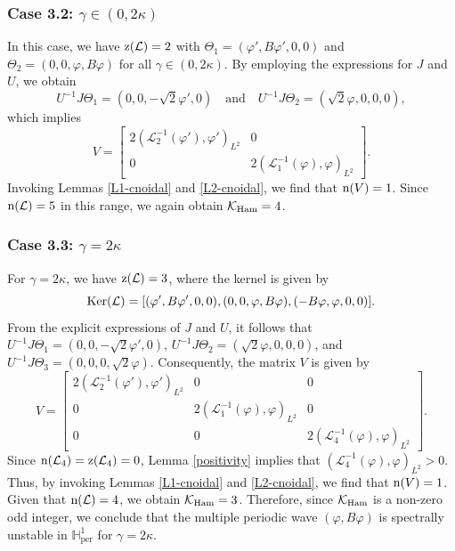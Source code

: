 \documentclass[10pt,reqno,a4paper]{amsart} %
\theoremstyle{definition} %
\numberwithin{equation}{section}
\numberwithin{figure}{section}
\begin{document}
\subsubsection*{Case 3.2: $\gamma \in (0,2\kappa)$} 
In this case, we have ${\rm z}(\mathcal{L}) = 2$ with $\Theta_1 = (\varphi', B \varphi', 0,0)$ and $\Theta_2 = (0,0, \varphi, B \varphi)$ for all $\gamma \in \left( 0, 2\kappa \right)$. By employing the expressions for $J$ and $U$, we obtain
\begin{equation*}
    U^{-1} J \Theta_1 = (0,0, -\sqrt{2} \varphi', 0) \quad \text{and} \quad U^{-1} J \Theta_2 = (\sqrt{2} \varphi, 0, 0, 0),
\end{equation*}
which implies
\begin{equation*}
    V = \begin{bmatrix}
        2 \left(\mathcal{L}_2^{-1} (\varphi'), \varphi'\right)_{L^2} & 0 \\
        0 & 2 \left(\mathcal{L}_1^{-1} (\varphi), \varphi\right)_{L^2}
    \end{bmatrix}.
\end{equation*}
Invoking Lemmas \ref{L1-cnoidal} and \ref{L2-cnoidal}, we find that ${\rm n}(V) = 1$. Since ${\rm n}(\mathcal{L}) = 5$ in this range, we again obtain $\mathcal{K}_{\rm Ham} = 4$.

\subsubsection*{Case 3.3: $\gamma = 2\kappa$} 

For $\gamma = 2 \kappa$, we have ${\rm z}(\mathcal{L}) = 3$, where the kernel is given by
\begin{equation*}
    {\rm Ker}(\mathcal{L}) = [(\varphi',B\varphi',0,0), (0,0,\varphi,B\varphi), (-B\varphi,\varphi,0,0)].
\end{equation*}
From the explicit expressions of $J$ and $U$, it follows that $U^{-1} J \Theta_1 = (0,0, -\sqrt{2} \varphi', 0)$, $U^{-1} J \Theta_2 = (\sqrt{2} \varphi, 0, 0, 0)$, and $U^{-1} J \Theta_3 = (0,0,0,\sqrt{2}\varphi)$. Consequently, the matrix $V$ is given by
\begin{equation*}
    V = \begin{bmatrix}
        2 \left(\mathcal{L}_2^{-1} (\varphi'), \varphi'\right)_{L^2} & 0 & 0 \\
        0 & 2 \left(\mathcal{L}_1^{-1} (\varphi), \varphi\right)_{L^2} & 0 \\
        0 & 0 & 2 \left(\mathcal{L}_4^{-1} (\varphi), \varphi\right)_{L^2}
    \end{bmatrix}.
\end{equation*}
Since ${\rm n}(\mathcal{L}_4) = {\rm z}(\mathcal{L}_4) = 0$, Lemma \ref{positivity} implies that $\left(\mathcal{L}_4^{-1} (\varphi), \varphi\right)_{L^2} > 0$. Thus, by invoking Lemmas \ref{L1-cnoidal} and \ref{L2-cnoidal}, we find that ${\rm n}(V) = 1$. Given that ${\rm n}(\mathcal{L}) = 4$, we obtain $\mathcal{K}_{\rm Ham} = 3$. Therefore, since $\mathcal{K}_{\rm Ham}$ is a non-zero odd integer, we conclude that the multiple periodic wave $(\varphi, B \varphi)$ is spectrally unstable in $\mathbb{H}^1_{\text{per}}$ for $\gamma = 2\kappa$.
\end{document}
